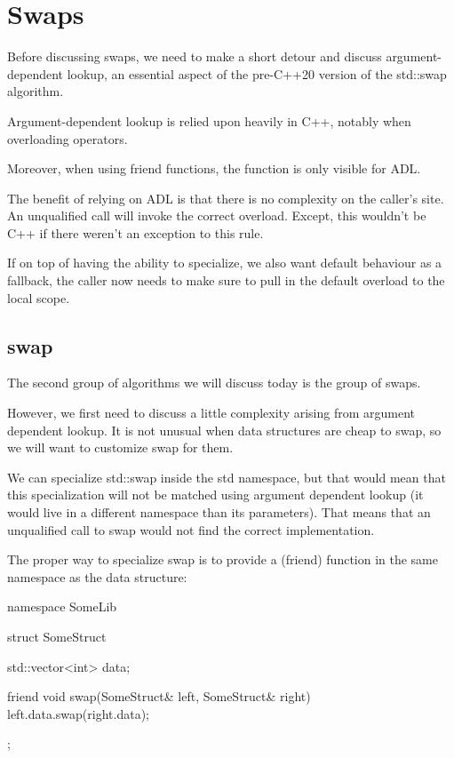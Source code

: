 \section{Swaps}

Before discussing swaps, we need to make a short detour and discuss argument-dependent lookup, an essential aspect of the pre-C++20 version of the std::swap algorithm.

Argument-dependent lookup is relied upon heavily in C++, notably when overloading operators.



Moreover, when using friend functions, the function is only visible for ADL.

The benefit of relying on ADL is that there is no complexity on the caller's site. An unqualified call will invoke the correct overload. Except, this wouldn't be C++ if there weren't an exception to this rule.

If on top of having the ability to specialize, we also want default behaviour as a fallback, the caller now needs to make sure to pull in the default overload to the local scope.

\subsection{swap}

The second group of algorithms we will discuss today is the group of swaps.


However, we first need to discuss a little complexity arising from argument dependent lookup. It is not unusual when data structures are cheap to swap, so we will want to customize swap for them.

We can specialize std::swap inside the std namespace, but that would mean that this specialization will not be matched using argument dependent lookup (it would live in a different namespace than its parameters). That means that an unqualified call to swap would not find the correct implementation.

The proper way to specialize swap is to provide a (friend) function in the same namespace as the data structure:

\begin{box-note}
\begin{cppcode}
namespace SomeLib {

struct SomeStruct {
    std::vector<int> data;

    friend void swap(SomeStruct& left, SomeStruct& right) {
        left.data.swap(right.data);
    }
};

}
\end{cppcode}
\end{box-note}

